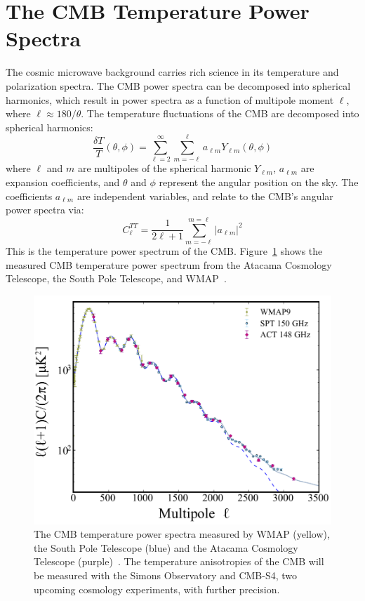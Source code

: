 \section{The CMB Temperature Power Spectra}
The cosmic microwave background carries rich science in its temperature and polarization spectra.  The CMB power spectra can be decomposed into spherical harmonics, which result in power spectra as a function of multipole moment $\ell$, where $\ell\approx180/\theta$.  The temperature fluctuations of the CMB are decomposed into spherical harmonics:
\begin{equation}
\frac{\delta T}{T}(\theta,\phi) = \sum_{\ell=2}^{\infty} \sum_{m=-\ell}^{\ell} a_{\ell m} Y_{\ell m}(\theta,\phi)
    \label{eq:cmb_temp}
\end{equation}
where $\ell$ and $m$ are multipoles of the spherical harmonic $Y_{\ell m}$, $a_{\ell m}$ are expansion coefficients, and $\theta$ and $\phi$ represent the angular position on the sky.  The coefficients $a_{\ell m}$ are independent variables, and relate to the CMB's angular power spectra via:
\begin{equation}
    C_\ell^{TT} = \frac{1}{2\ell +1} \sum_{m=-\ell}^{m=\ell} |a_{\ell m}|^2
\end{equation}
This is the temperature power spectrum of the CMB.  Figure~\ref{fig:measured_cmb_spec} shows the measured CMB temperature power spectrum from the Atacama Cosmology Telescope, the South Pole Telescope, and WMAP~\cite{Das_2014}.
\begin{figure}[t]
    \centering
    \includegraphics[width = .75\textwidth]{Figures/temp_power_spectrum.pdf}
    \caption{The CMB temperature power spectra measured by WMAP (yellow), the South Pole Telescope (blue) and the Atacama Cosmology Telescope (purple)~\cite{Das_2014}.  The temperature anisotropies of the CMB will be measured with the Simons Observatory and CMB-S4, two upcoming cosmology experiments, with further precision.}
    \label{fig:measured_cmb_spec}
\end{figure}
